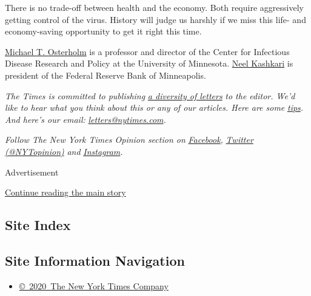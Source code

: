 There is no trade-off between health and the economy. Both require
aggressively getting control of the virus. History will judge us harshly
if we miss this life- and economy-saving opportunity to get it right
this time.

\href{https://www.cidrap.umn.edu/about-us/cidrap-staff/michael-t-osterholm-phd-mph}{Michael
T. Osterholm} is a professor and director of the Center for Infectious
Disease Research and Policy at the University of Minnesota.
\href{https://www.federalreservehistory.org/people/neel_kashkari}{Neel
Kashkari} is president of the Federal Reserve Bank of Minneapolis.

\emph{The Times is committed to publishing}
\href{https://www.nytimes.com/2019/01/31/opinion/letters/letters-to-editor-new-york-times-women.html}{\emph{a
diversity of letters}} \emph{to the editor. We'd like to hear what you
think about this or any of our articles. Here are some}
\href{https://help.nytimes.com/hc/en-us/articles/115014925288-How-to-submit-a-letter-to-the-editor}{\emph{tips}}\emph{.
And here's our email:}
\href{mailto:letters@nytimes.com}{\emph{letters@nytimes.com}}\emph{.}

\emph{Follow The New York Times Opinion section on}
\href{https://www.facebook.com/nytopinion}{\emph{Facebook}}\emph{,}
\href{http://twitter.com/NYTOpinion}{\emph{Twitter (@NYTopinion)}}
\emph{and}
\href{https://www.instagram.com/nytopinion/}{\emph{Instagram}}\emph{.}

Advertisement

\protect\hyperlink{after-bottom}{Continue reading the main story}

\hypertarget{site-index}{%
\subsection{Site Index}\label{site-index}}

\hypertarget{site-information-navigation}{%
\subsection{Site Information
Navigation}\label{site-information-navigation}}

\begin{itemize}
\tightlist
\item
  \href{https://help.nytimes.com/hc/en-us/articles/115014792127-Copyright-notice}{©~2020~The
  New York Times Company}
\end{itemize}

